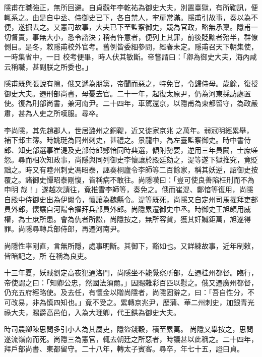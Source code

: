 \begin{pinyinscope}
 隱甫在職強正，無所回避。自貞觀年李乾祐為御史大夫，別置臺獄，有所鞫訊，便輒系之。由是自中丞、侍御史已下，各自禁人，牢扉常滿。隱甫引故事，奏以為不便，遂掘去之。又憲司故事，大夫已下至監察御史，競為官政，略無承稟。隱甫一切督責，事無大小，悉令諮決；稍有忤意者，便列上其罪，前後貶黜者殆半，群僚側目。是冬，敕隱甫校外官考。舊例皆委細參問，經春未定。隱甫召天下朝集使，一時集省中，一日
 校考便畢，時人伏其敏斷。帝嘗謂曰：「卿為御史大夫，海內咸云稱職，甚副朕之所委也。」



 隱甫既與張說有隙，俄又遞為朋黨，帝聞而惡之，特免官，令歸侍母。歲餘，復授御史大夫。遷刑部尚書，母憂去官。二十一年，起復太原尹，仍為河東採訪處置使。復為刑部尚書，兼河南尹。二十四年，車駕還京，以隱甫為東都留守，為政嚴肅，甚為人吏之所嘆服。尋卒。



 李尚隱，其先趙郡人，世居潞州之銅鞮，近又徙家京兆
 之萬年。弱冠明經累舉，補下邽主簿。時姚珽為同州刺史，甚禮之。景龍中，為左臺監察御史。時中書侍郎、知吏部選事崔湜及吏部侍郎鄭愔同時典選，傾附勢要，逆用三年員闕，士庶嗟怨。尋而相次知政事，尚隱與同列御史李懷讓於殿廷劾之，湜等遂下獄推究，竟貶黜之。時又有睦州刺史馮昭泰，誣奏桐廬令李師等二百餘家，稱其妖逆，詔御史按覆之。諸御史憚昭泰剛愎，皆稱病不敢往。尚隱嘆曰：「豈可使良善陷枉刑而不為申明
 哉！」遂越次請往，竟推雪李師等，奏免之。俄而崔湜、鄭愔等復用，尚隱自殿中侍御史出為伊闕令，懷讓為魏縣令。湜等既死，尚隱又自定州司馬擢拜吏部員外郎，懷讓自河陽令擢拜兵部員外郎。尚隱累遷御史中丞。時御史王旭頗用威權，為士庶所患。會為仇者所訟，尚隱按之，無所容貸，獲其奸贓鉅萬，旭遂得罪。尚隱尋轉兵部侍郎，再遷河南尹。



 尚隱性率剛直，言無所隱，處事明斷。其御下，豁如也。又詳練故事，近年制敕，皆暗記之，所
 在稱為良吏。



 十三年夏，妖賊劉定高夜犯通洛門，尚隱坐不能覺察所部，左遷桂州都督。臨行，帝使謂之曰：「知卿公忠，然國法須爾。」因賜雜彩百匹以慰之。俄又遷廣州都督，仍充五府經略使。及去任，有懷金以贈尚隱者，尚隱固辭之，曰：「吾自性分，不可改易，非為慎四知也。」竟不受之。累轉京兆尹，歷蒲、華二州刺史，加銀青光祿大夫，賜爵高邑伯，入為大理卿，代王鉷為御史大夫。



 時司農卿陳思問多引小人為其屬吏，隱盜錢穀，積至累萬。
 尚隱又舉按之，思問遂流嶺南而死。尚隱三為憲官，輒去朝廷之所惡者，時議甚以此稱之。二十四年，拜戶部尚書、東都留守。二十八年，轉太子賓客。尋卒，年七十五，謚曰貞。




\end{pinyinscope}
